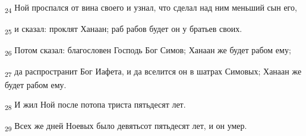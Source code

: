 \begin{tcolorbox}
\textsubscript{24} Ной проспался от вина своего и узнал, что сделал над ним меньший сын его,
\end{tcolorbox}
\begin{tcolorbox}
\textsubscript{25} и сказал: проклят Ханаан; раб рабов будет он у братьев своих.
\end{tcolorbox}
\begin{tcolorbox}
\textsubscript{26} Потом сказал: благословен Господь Бог Симов; Ханаан же будет рабом ему;
\end{tcolorbox}
\begin{tcolorbox}
\textsubscript{27} да распространит Бог Иафета, и да вселится он в шатрах Симовых; Ханаан же будет рабом ему.
\end{tcolorbox}
\begin{tcolorbox}
\textsubscript{28} И жил Ной после потопа триста пятьдесят лет.
\end{tcolorbox}
\begin{tcolorbox}
\textsubscript{29} Всех же дней Ноевых было девятьсот пятьдесят лет, и он умер.
\end{tcolorbox}
